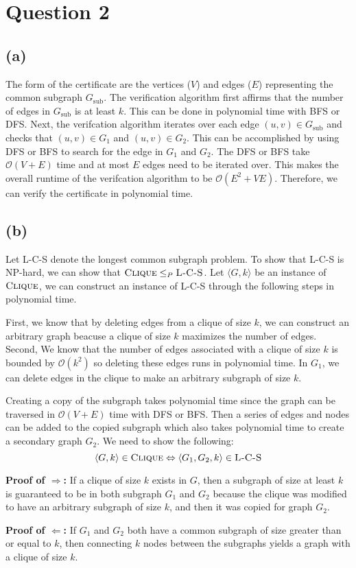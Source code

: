 \section{Question 2}
\subsection{(a)}
The form of the certificate are the vertices ($V$) and edges ($E$) representing the common subgraph $G_{\text{sub}}$.
The verification algorithm first affirms that the number of edges in $G_{\text{sub}}$ is at least $k$.
This can be done in polynomial time with BFS or DFS.
Next, the verifcation algorithm iterates over each edge $(u, v) \in G_{\text{sub}}$ and checks that $(u, v) \in G_1$ and $(u, v) \in G_2$.
This can be accomplished by using DFS or BFS to search for the edge in $G_1$ and $G_2$.
The DFS or BFS take $\mathcal{O}(V + E)$ time and at most $E$ edges need to be iterated over.
This makes the overall runtime of the verifcation algorithm to be $\mathcal{O}(E^2 + VE)$.
Therefore, we can verify the certificate in polynomial time.
\subsection{(b)}
Let \textsc{L-C-S} denote the longest common subgraph problem.
To show that \textsc{L-C-S} is NP-hard, we can show that $\textsc{Clique} \leq_P \textsc{L-C-S}$.
Let $\langle G, k \rangle$ be an instance of $\textsc{Clique}$,
we can construct an instance of \textsc{L-C-S} through
the following steps in polynomial time.

First, we know that by deleting edges from a clique of size $k$,
we can construct an arbitrary graph beacuse a clique of size $k$ maximizes
the number of edges. Second, We know that the number of
edges associated with a clique of size $k$ is bounded by $\mathcal{O}(k^2)$
so deleting these edges runs in polynomial time. In $G_1$,
we can delete edges in the clique to make an arbitrary subgraph of size $k$.

Creating a copy of the subgraph takes polynomial time since the graph can be
traversed in  $\mathcal{O}(V + E)$ time with DFS or BFS. Then a series of edges and nodes
can be added to the copied subgraph which also takes polynomial time to create a secondary
graph $G_2$. We need to show the following:
\[\langle G, k \rangle \in \textsc{Clique} \Leftrightarrow \langle G_1, G_2, k \rangle \in \textsc{L-C-S}\]

\textbf{Proof of $\Rightarrow$:}
If a clique of size $k$ exists in $G$, then a subgraph of size at least $k$ is guaranteed to be
in both subgraph $G_1$ and $G_2$ because the clique was modified to have an arbitrary subgraph of size $k$,
and then it was copied for graph $G_2$.

\textbf{Proof of $\Leftarrow$:}
If $G_1$ and $G_2$ both have a common subgraph of size greater than or equal to $k$, then connecting $k$ nodes between the subgraphs
yields a graph with a clique of size $k$.